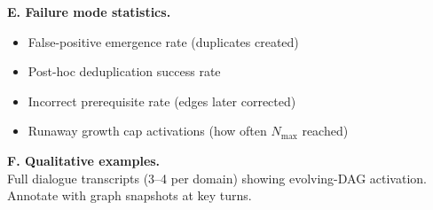 \documentclass[11pt,a4paper]{article}
\begin{document}
{  \textbf{E. Failure mode statistics.}\\
  \begin{itemize}[noitemsep]
    \item False-positive emergence rate (duplicates created)
    \item Post-hoc deduplication success rate
    \item Incorrect prerequisite rate (edges later corrected)
    \item Runaway growth cap activations (how often $N_{\max}$ reached)
  \end{itemize}

  \textbf{F. Qualitative examples.}\\
  Full dialogue transcripts (3--4 per domain) showing evolving-DAG
  activation. Annotate with graph snapshots at key turns.
}
\end{document}
